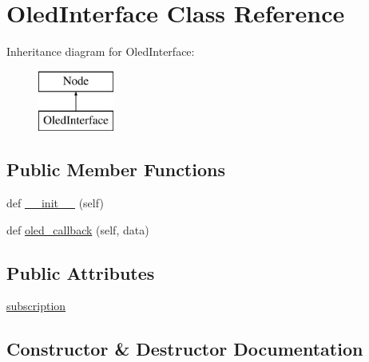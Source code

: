 \hypertarget{classtoxic__hardware_1_1oled__interface_1_1OledInterface}{}\section{Oled\+Interface Class Reference}
\label{classtoxic__hardware_1_1oled__interface_1_1OledInterface}
Inheritance diagram for Oled\+Interface\+:\begin{figure}[H]
\begin{center}
\leavevmode
\includegraphics[height=2.000000cm]{d9/d4e/classtoxic__hardware_1_1oled__interface_1_1OledInterface}
\end{center}
\end{figure}
\subsection*{Public Member Functions}
\begin{DoxyCompactItemize}
\item 
def \mbox{\hyperlink{classtoxic__hardware_1_1oled__interface_1_1OledInterface_ae64f0875afe3067b97ba370b354b9213}{\+\_\+\+\_\+init\+\_\+\+\_\+}} (self)
\item 
def \mbox{\hyperlink{classtoxic__hardware_1_1oled__interface_1_1OledInterface_a956e7ab59d12fa1dc3e975c2fba46296}{oled\+\_\+callback}} (self, data)
\end{DoxyCompactItemize}
\subsection*{Public Attributes}
\begin{DoxyCompactItemize}
\item 
\mbox{\hyperlink{classtoxic__hardware_1_1oled__interface_1_1OledInterface_a4b0698733c4dfaffe8e2b4cd952b6f82}{subscription}}
\end{DoxyCompactItemize}


\subsection{Constructor \& Destructor Documentation}
\mbox{\label{classtoxic__hardware_1_1oled__interface_1_1OledInterface_ae64f0875afe3067b97ba370b354b9213}} 
